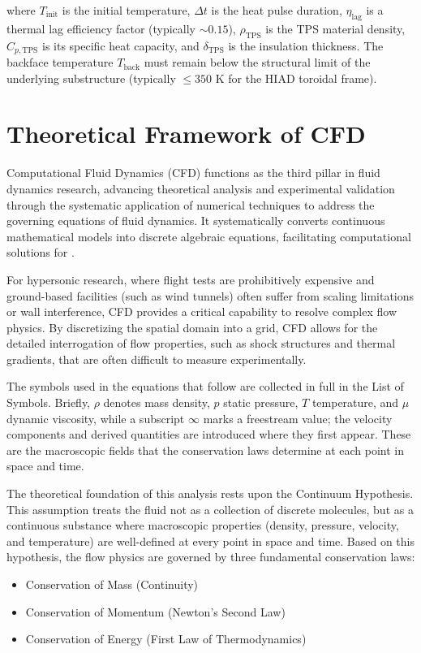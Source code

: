 \noindent where $T_{\text{init}}$ is the initial temperature, $\Delta t$ is the heat pulse duration, $\eta_{\text{lag}}$ is a thermal lag efficiency factor (typically $\sim 0.15$), $\rho_{\text{TPS}}$ is the TPS material density, $C_{p,\text{TPS}}$ is its specific heat capacity, and $\delta_{\text{TPS}}$ is the insulation thickness. The backface temperature $T_{\text{back}}$ must remain below the structural limit of the underlying substructure (typically $\leq 350$ K for the HIAD toroidal frame).

\section{Theoretical Framework of CFD}
\label{sec:cfd_framework}
Computational Fluid Dynamics (CFD) functions as the third pillar in fluid dynamics research, advancing theoretical analysis and experimental validation through the systematic application of numerical techniques to address the governing equations of fluid dynamics. It systematically converts continuous mathematical models into discrete algebraic equations, facilitating computational solutions for \cite{versteeg2007cfd}.
\par
For hypersonic research, where flight tests are prohibitively expensive and ground-based facilities (such as wind tunnels) often suffer from scaling limitations or wall interference, CFD provides a critical capability to resolve complex flow physics. By discretizing the spatial domain into a grid, CFD allows for the detailed interrogation of flow properties, such as shock structures and thermal gradients, that are often difficult to measure experimentally.
\par
The symbols used in the equations that follow are collected in full in the List of Symbols. Briefly, $\rho$ denotes mass density, $p$ static pressure, $T$ temperature, and $\mu$ dynamic viscosity, while a subscript $\infty$ marks a freestream value; the velocity components and derived quantities are introduced where they first appear. These are the macroscopic fields that the conservation laws determine at each point in space and time.
\par
The theoretical foundation of this analysis rests upon the Continuum Hypothesis. This assumption treats the fluid not as a collection of discrete molecules, but as a continuous substance where macroscopic properties (density, pressure, velocity, and temperature) are well-defined at every point in space and time. Based on this hypothesis, the flow physics are governed by three fundamental conservation laws:
\begin{itemize}
    \item Conservation of Mass (Continuity)

    \item Conservation of Momentum (Newton's Second Law)

    \item Conservation of Energy (First Law of Thermodynamics)
\end{itemize}

